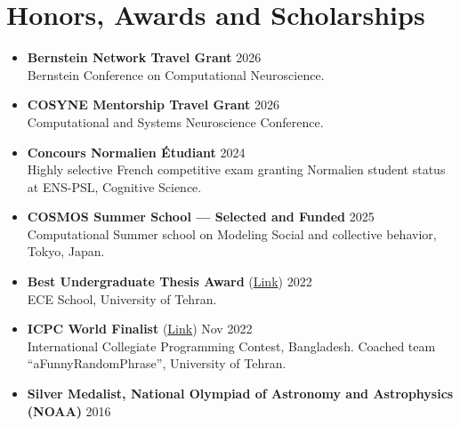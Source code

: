 \documentclass[a4paper,10pt]{article}
\begin{document}
\section{Honors, Awards and Scholarships}
\begin{itemize}[leftmargin=*, itemsep=2pt, topsep=1pt]

\item \textbf{Bernstein Network Travel Grant} \hfill \textcolor{dateColor}{2026}\\
\small Bernstein Conference on Computational Neuroscience.\normalsize

\item \textbf{COSYNE Mentorship Travel Grant} \hfill \textcolor{dateColor}{2026}\\
\small Computational and Systems Neuroscience Conference.\normalsize

\item \textbf{Concours Normalien Étudiant} \hfill \textcolor{dateColor}{2024}\\
\small Highly selective French competitive exam granting Normalien student status at ENS-PSL, Cognitive Science.\normalsize

\item \textbf{COSMOS Summer School — Selected and Funded} \hfill \textcolor{dateColor}{2025}\\
\small Computational Summer school on Modeling Social and collective behavior, Tokyo, Japan.\normalsize

\item \textbf{Best Undergraduate Thesis Award} (\href{https://drive.google.com/file/d/1dFarQ_0jxwia8QhlvITzfBa2EX7LxTP8/view?usp=sharing}{Link}) \hfill \textcolor{dateColor}{2022}\\
\small ECE School, University of Tehran.\normalsize

\item \textbf{ICPC World Finalist} (\href{https://drive.google.com/file/d/1wK22GhE4BWR9wMX0tNm0LfCSdLaK4h85/view?usp=sharing}{Link}) \hfill \textcolor{dateColor}{Nov 2022}\\
\small International Collegiate Programming Contest, Bangladesh. Coached team ``aFunnyRandomPhrase'', University of Tehran.\normalsize

\item \textbf{Silver Medalist,  National Olympiad of Astronomy and Astrophysics (NOAA)} \hfill \textcolor{dateColor}{2016}

\end{itemize}
\end{document}
